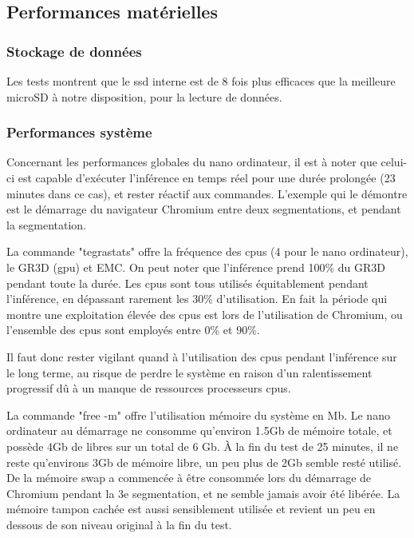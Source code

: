 ﻿\subsection{Performances matérielles}
\subsubsection{Stockage de données}
\par Les tests montrent que le \acrshort{ssd} interne est de 8 fois plus efficaces que la meilleure microSD à notre disposition, pour la lecture de données. 
\subsubsection{Performances système}
\par Concernant les performances globales du nano ordinateur, il est à noter que celui-ci est capable d'exécuter l'inférence en temps réel pour une durée prolongée (23 minutes dans ce cas), et rester réactif aux commandes. L'exemple qui le démontre est le démarrage du navigateur Chromium entre deux segmentations, et pendant la segmentation.
\par La commande "tegrastats" offre la fréquence des \acrshort{cpu}s (4 pour le nano ordinateur), le GR3D (\acrshort{gpu}) et EMC. On peut noter que l'inférence prend 100\% du GR3D pendant toute la durée. Les \acrshort{cpu}s sont tous utilisés équitablement pendant l'inférence, en dépassant rarement les 30\% d'utilisation. En fait la période qui montre une exploitation élevée des \acrshort{cpu}s est lors de l'utilisation de Chromium, ou l'ensemble des \acrshort{cpu}s sont employés entre 0\% et 90\%. 
\par Il faut donc rester vigilant quand à l'utilisation des \acrshort{cpu}s pendant l'inférence sur le long terme, au risque de perdre le système en raison d'un ralentissement progressif dû à un manque de ressources processeurs \acrshort{cpu}s.
\par La commande "free -m" offre l'utilisation mémoire du système en Mb. Le nano ordinateur au démarrage ne consomme qu'environ 1.5Gb de mémoire totale, et possède 4Gb de libres sur un total de 6 Gb. À la fin du test de 25 minutes, il ne reste qu'environs 3Gb de mémoire libre, un peu plus de 2Gb semble resté utilisé. De la mémoire swap a commencée à être consommée lors du démarrage de Chromium pendant la 3e segmentation, et ne semble jamais avoir été libérée. La mémoire tampon cachée est aussi sensiblement utilisée et revient un peu en dessous de son niveau original à la fin du test. 
